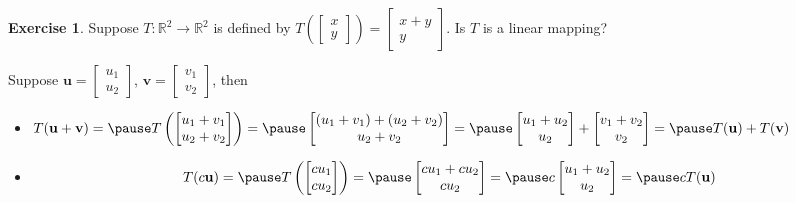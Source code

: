 \documentclass{beamer}
\theoremstyle{definition}
\newtheorem{exercise}[theorem]{Exercise}
\theoremstyle{remark}
\begin{document}
\begin{frame}[t]
\begin{exercise}\label{ex: matrix transformation}
Suppose $T:\mathbb R^2\to\mathbb R^2$ is defined by $T\left(\begin{bmatrix}
x\\y
\end{bmatrix}\right)=\begin{bmatrix}
x+y\\
y
\end{bmatrix}$. Is $T$ is a linear mapping?
\end{exercise}
\pause
\begin{solution}
Suppose $\mathbf u=\begin{bmatrix}
u_1\\u_2
\end{bmatrix}$, $\mathbf v=\begin{bmatrix}
v_1\\v_2
\end{bmatrix}$, then\pause
\begin{itemize}
\item 
$T(\mathbf u+\mathbf v)=\pause T\left(\begin{bmatrix}
u_1+v_1\\u_2+v_2
\end{bmatrix}\right)=\pause\begin{bmatrix}
(u_1+v_1)+(u_2+v_2)\\u_2+v_2
\end{bmatrix}=\pause\begin{bmatrix}
u_1+u_2\\u_2
\end{bmatrix}+\begin{bmatrix}
v_1+v_2\\v_2
\end{bmatrix}=\pause T(\mathbf u)+T(\mathbf v)$
\item 
\[
T(c\mathbf u)=\pause T\left(\begin{bmatrix}
cu_1\\cu_2
\end{bmatrix}\right)=\pause\begin{bmatrix}
cu_1+cu_2\\cu_2
\end{bmatrix}=\pause c\begin{bmatrix}
u_1+u_2\\u_2
\end{bmatrix}=\pause cT(\mathbf u)
\]
\end{itemize}
\end{solution}
\end{frame}
\end{document}
